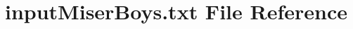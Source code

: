 \hypertarget{inputMiserBoys_8txt}{}\section{input\+Miser\+Boys.\+txt File Reference}
\label{inputMiserBoys_8txt}
